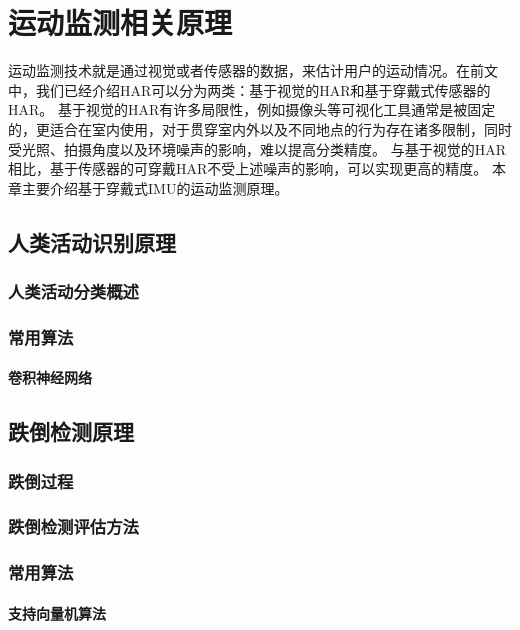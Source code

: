 


\chapter{运动监测相关原理}
运动监测技术就是通过视觉或者传感器的数据，来估计用户的运动情况。在前文中，我们已经介绍HAR可以分为两类：基于视觉的HAR和基于穿戴式传感器的HAR。
基于视觉的HAR有许多局限性，例如摄像头等可视化工具通常是被固定的，更适合在室内使用，对于贯穿室内外以及不同地点的行为存在诸多限制，同时受光照、拍摄角度以及环境噪声的影响，难以提高分类精度。
与基于视觉的HAR相比，基于传感器的可穿戴HAR不受上述噪声的影响，可以实现更高的精度。
本章主要介绍基于穿戴式IMU的运动监测原理。


\section{人类活动识别原理}
\subsection{人类活动分类概述}



\subsection{常用算法}
\subsubsection{卷积神经网络}

\section{跌倒检测原理}
\subsection{跌倒过程}


\subsection{跌倒检测评估方法}
\subsection{常用算法}
\subsubsection{支持向量机算法}




